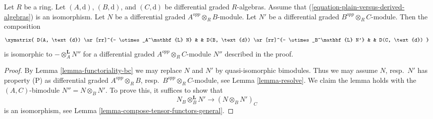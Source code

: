 \begin{lemma}
\label{lemma-compose-tensor-functors-general-algebra}
Let $R$ be a ring. Let $(A, \text{d})$, $(B, \text{d})$, and
$(C, \text{d})$ be differential graded $R$-algebras. Assume
that (\ref{equation-plain-versus-derived-algebras}) is an isomorphism.
Let $N$ be a differential graded $A^{opp} \otimes_R B$-module.
Let $N'$ be a differential graded $B^{opp} \otimes_R C$-module.
Then the composition
$$
\xymatrix{
D(A, \text{d}) \ar[rr]^{- \otimes_A^\mathbf{L} N} & &
D(B, \text{d}) \ar[rr]^{- \otimes_B^\mathbf{L} N'} & &
D(C, \text{d})
}
$$
is isomorphic to $- \otimes_A^\mathbf{L} N''$ for a differential graded
$A^{opp} \otimes_R C$-module $N''$ described in the proof.
\end{lemma}

\begin{proof}
By Lemma \ref{lemma-functoriality-bc} we may replace $N$ and $N'$ by
quasi-isomorphic bimodules. Thus we may assume $N$, resp.\ $N'$
has property (P) as differential graded
$A^{opp} \otimes_R B$, resp.\ $B^{opp} \otimes_R C$-module, see
Lemma \ref{lemma-resolve}. We claim the lemma holds
with the $(A, C)$-bimodule $N'' = N \otimes_B N'$.
To prove this, it suffices to show that
$$
N_B \otimes_B^\mathbf{L} N' \longrightarrow (N \otimes_B N')_C
$$
is an isomorphism, see Lemma \ref{lemma-compose-tensor-functors-general}.


\end{proof}
